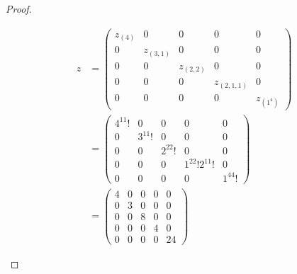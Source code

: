 \documentclass[12pt]{extarticle}
\newcommand{\<}{\langle}
\renewcommand{\>}{\rangle}
\theoremstyle{definition}
\begin{document}
\begin{proof}
\begin{enumerate}
\begin{align*}
      z
      &=
      \begin{pmatrix}
        z_{(4)} & 0 & 0 & 0 & 0 \\
        0 & z_{(3,1)} & 0 & 0 & 0 \\
        0 & 0 & z_{(2,2)} & 0 & 0 \\
        0 & 0 & 0 & z_{(2,1,1)} & 0 \\
        0 & 0 & 0 & 0 & z_{(1^4)}
      \end{pmatrix} \\
      &=
      \begin{pmatrix}
        4^11! & 0 & 0 & 0 & 0 \\
        0 & 3^11! & 0 & 0 & 0 \\
        0 & 0 & 2^22! & 0 & 0 \\
        0 & 0 & 0 & 1^22!2^11! & 0 \\
        0 & 0 & 0 & 0 & 1^44!
      \end{pmatrix} \\
      &=
      \begin{pmatrix}
        4 & 0 & 0 & 0 & 0 \\
        0 & 3 & 0 & 0 & 0 \\
        0 & 0 & 8 & 0 & 0 \\
        0 & 0 & 0 & 4 & 0 \\
        0 & 0 & 0 & 0 & 24
      \end{pmatrix}
    \end{align*}
  \end{enumerate}
\end{proof}
\end{document}
